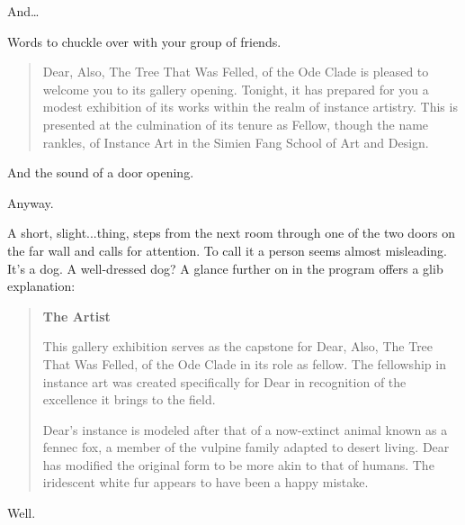 \begin{center}
  And\ldots{}
\end{center}

\vfill

\newpage

Words to chuckle over with your group of friends.

\begin{quotation}
Dear, Also, The Tree That Was Felled, of the Ode Clade is pleased to welcome you to its gallery opening. Tonight, it has prepared for you a modest exhibition of its works within the realm of instance artistry. This is presented at the culmination of its tenure as Fellow, though the name rankles, of Instance Art in the Simien Fang School of Art and Design.
\end{quotation}

\vfill

And the sound of a door opening.

\vfill

\newpage

\null
\vfill

\begin{flushright}
  Anyway.
\end{flushright}

\vfill

\newpage

A short, slight...thing, steps from the next room through one of the two doors on the far wall and calls for attention. To call it a person seems almost misleading. It's a dog. A well-dressed dog? A glance further on in the program offers a glib explanation:

\begin{quotation}
\textbf{The Artist}

This gallery exhibition serves as the capstone for Dear, Also, The Tree That Was Felled, of the Ode Clade in its role as fellow. The fellowship in instance art was created specifically for Dear in recognition of the excellence it brings to the field.

Dear's instance is modeled after that of a now-extinct animal known as a fennec fox, a member of the vulpine family adapted to desert living. Dear has modified the original form to be more akin to that of humans. The iridescent white fur appears to have been a happy mistake.
\end{quotation}

\vfill

Well.

\vfill

